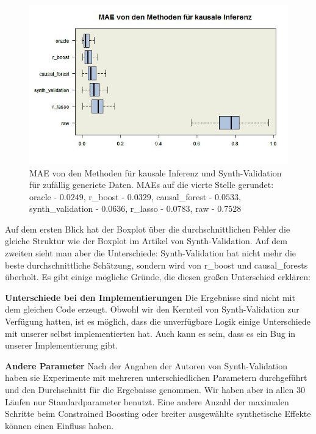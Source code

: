 \documentclass[12pt,a4paper,twoside]{scrartcl}
\numberwithin{equation}{section}
\begin{document}
\begin{center}
\begin{figure}[h]
    \centering
    \includegraphics[height=0.5\textwidth, width=1\textwidth]{figures/plots/randomBoxplot.jpeg}
    \caption[MAE von den Methoden für kausale Inferenz und Synth-Validation für zufällig generiete Daten]{MAE von den Methoden für kausale Inferenz und Synth-Validation für zufällig generiete Daten. MAEs auf die vierte Stelle gerundet: oracle - $0.0249$, r\_boost - $0.0329$, causal\_forest - $0.0533$, synth\_validation - $0.0636$, r\_lasso - $0.0783$, raw - $0.7528$}\label{fig:randomBoxplot}
  \end{figure}
\end{center}

\noindent
Auf dem ersten Blick hat der Boxplot über die durchschnittlichen Fehler die gleiche Struktur wie der Boxplot im Artikel von Synth-Validation\cite{schuler2017synth}. Auf dem zweiten sieht man aber die Unterschiede: Synth-Validation hat nicht mehr die beste durchschnittliche Schätzung, sondern wird von r\_boost und causal\_forests überholt. Es gibt einige mögliche Gründe, die diesen großen  Unterschied erklären: \par

\noindent
\textbf{Unterschiede bei den Implementierungen} Die Ergebnisse sind nicht mit dem gleichen Code erzeugt. Obwohl wir den Kernteil von Synth-Validation zur Verfügung hatten, ist es möglich, dass die unverfügbare Logik einige Unterschiede mit unserer selbst implementierten hat. Auch kann es sein, dass es ein Bug in unserer Implementierung gibt.
\par

\noindent
\textbf{Andere Parameter} Nach der Angaben der Autoren von Synth-Validation haben sie Experimente mit mehreren unterschiedlichen Parametern durchgeführt und den Durchschnitt für die Ergebnisse genommen\cite{schuler2017synth}. Wir haben aber in allen 30 Läufen nur Standardparameter benutzt. Eine andere Anzahl der maximalen Schritte beim Constrained Boosting oder breiter ausgewählte synthetische Effekte können einen Einfluss haben.  
\par
\end{document}
